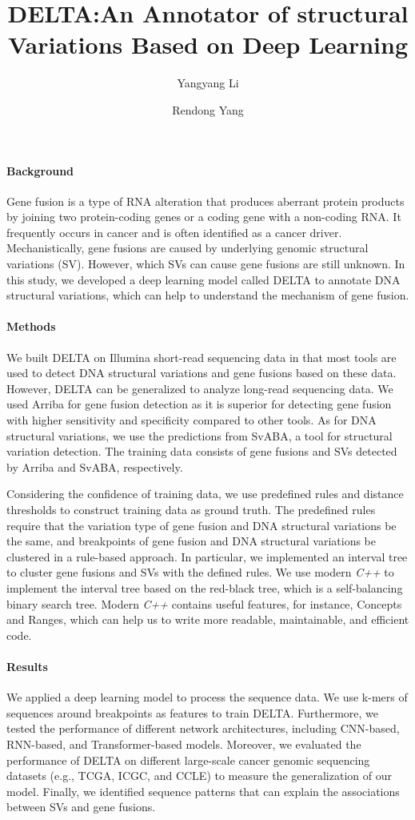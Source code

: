 \documentclass{article}
\title{DELTA:An Annotator of structural Variations Based on Deep Learning}
\author[1]{Yangyang Li}
\author[1]{Rendong Yang}
\affil[1]{\small Department of Urology, Northwestern University Feinberg School of Medicine, Chicago, IL 60611,
USA.}
\date{}
\begin{document}
\maketitle

\paragraph*{Background}
Gene fusion is a type of RNA alteration that produces aberrant protein products by joining two protein-coding genes or a coding gene with a non-coding RNA\@.
It frequently occurs in cancer and is often identified as a cancer driver.
Mechanistically, gene fusions are caused by underlying genomic structural variations (SV).
However, which SVs can cause gene fusions are still unknown.
In this study, we developed a deep learning model called DELTA to annotate DNA structural variations, which can help to understand the mechanism of gene fusion.

\paragraph*{Methods}
We built DELTA on Illumina short-read sequencing data in that most tools are used to detect DNA structural variations and gene fusions based on these data.
However, DELTA can be generalized to analyze long-read sequencing data.
We used Arriba for gene fusion detection as it is superior for detecting gene fusion with higher sensitivity and specificity compared to other tools.
As for DNA structural variations, we use the predictions from SvABA, a tool for structural variation detection.
The training data consists of gene fusions and SVs detected by Arriba and SvABA, respectively.

Considering the confidence of training data, we use predefined rules and distance thresholds to construct training data as ground truth.
The predefined rules require that the variation type of gene fusion and DNA structural variations be the same, and breakpoints of gene fusion and DNA structural variations be clustered in a rule-based approach.
In particular, we implemented an interval tree to cluster gene fusions and SVs with the defined rules.
We use modern \textit{C++} to implement the interval tree based on the red-black tree, which is a self-balancing binary search tree.
Modern \textit{C++} contains useful features, for instance, Concepts and Ranges, which can help us to write more readable, maintainable, and efficient code.

\paragraph*{Results}
We applied a deep learning model to process the sequence data. We use k-mers of sequences around breakpoints as features to train DELTA\@.
Furthermore, we tested the performance of different network architectures, including CNN-based, RNN-based, and Transformer-based models.
Moreover, we evaluated the performance of DELTA on different large-scale cancer genomic sequencing datasets (e.g., TCGA, ICGC, and CCLE) to measure the generalization of our model.
Finally, we identified sequence patterns that can explain the associations between SVs and gene fusions.
\end{document}
